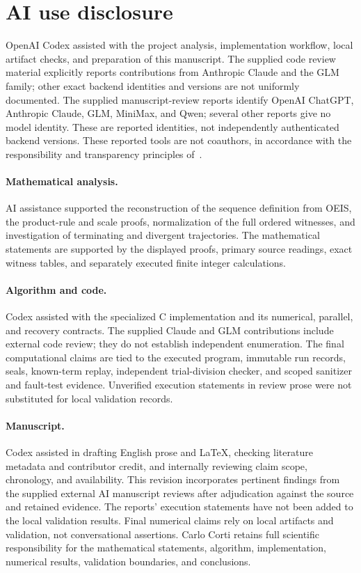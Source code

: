 \documentclass[11pt,a4paper]{article}
\theoremstyle{definition}
\theoremstyle{remark}
\begin{document}
\section*{AI use disclosure}
OpenAI Codex assisted with the project analysis, implementation workflow,
local artifact checks, and preparation of this manuscript. The supplied code
review material explicitly reports contributions from Anthropic Claude and
the GLM family; other exact backend identities and versions are not uniformly
documented. The supplied manuscript-review reports identify OpenAI ChatGPT,
Anthropic Claude, GLM, MiniMax, and Qwen; several other reports give no
model identity. These are reported identities, not independently
authenticated backend versions. These reported tools are not coauthors, in accordance with the
responsibility and transparency principles of~\cite{cope}.

\paragraph{Mathematical analysis.}
AI assistance supported the reconstruction of the sequence definition from
OEIS, the product-rule and scale proofs, normalization of the full ordered
witnesses, and investigation of terminating and divergent trajectories.
The mathematical statements are supported by the displayed proofs, primary
source readings, exact witness tables, and separately executed finite
integer calculations.

\paragraph{Algorithm and code.}
Codex assisted with the specialized C implementation and its numerical,
parallel, and recovery contracts. The supplied Claude and GLM contributions
include external code review; they do not establish independent enumeration.
The final computational claims are tied to the executed program, immutable
run records, seals, known-term replay, independent trial-division checker,
and scoped sanitizer and fault-test evidence. Unverified execution statements
in review prose were not substituted for local validation records.

\paragraph{Manuscript.}
Codex assisted in drafting English prose and LaTeX, checking literature
metadata and contributor credit, and internally reviewing claim scope,
chronology, and availability. This revision incorporates pertinent findings from the supplied external
AI manuscript reviews after adjudication against the source and retained
evidence. The reports' execution statements have not been added to the
local validation results. Final numerical claims rely on local artifacts
and validation, not conversational assertions. Carlo Corti retains full
scientific responsibility for the mathematical statements, algorithm,
implementation, numerical results, validation boundaries, and conclusions.
\end{document}
